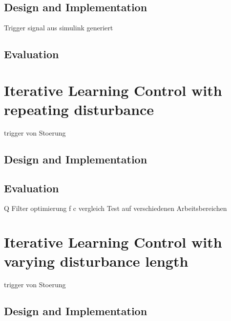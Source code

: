 \subsection{Design and Implementation}
Trigger signal aus simulink generiert
\subsection{Evaluation}

\section{Iterative Learning Control with repeating disturbance}
trigger von Stoerung
\subsection{Design and Implementation}

\subsection{Evaluation}
Q Filter optimierung f c vergleich
Test auf verschiedenen Arbeitsbereichen
\section{Iterative Learning Control with varying disturbance length}
trigger von Stoerung
\subsection{Design and Implementation}
